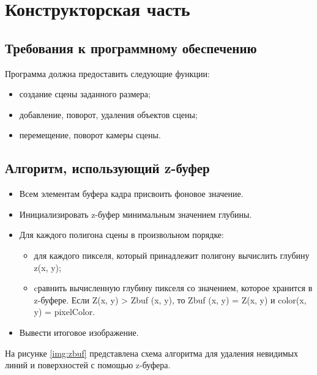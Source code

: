 \chapter{Конструкторская часть}

\section{Требования к программному обеспечению}

Программа должна предоставить следующие функции:
\begin{itemize}
    \item создание сцены заданного размера;
    \item добавление, поворот, удаления объектов сцены;
    \item перемещение, поворот камеры сцены.
\end{itemize}

\section{Алгоритм, использующий z-буфер}

\begin{itemize}[label={$\bullet$}]
    \item Всем элементам буфера кадра присвоить фоновое значение.
    \item Инициализировать z-буфер минимальным значением глубины.
    \item Для каждого полигона сцены в произвольном порядке:	
    \begin{itemize}[label={$\circ$}]
        \item для каждого пикселя, который принадлежит полигону вычислить глубину z(x, y); 
        \item cравнить вычисленную глубину пикселя со значением, которое хранится в z-буфере. 
        Если Z(x, y) > Zbuf (x, y), то Zbuf (x, y) = Z(x, y) и color(x, y) = pixelColor. 
    \end{itemize}
    \item Вывести итоговое изображение.
\end{itemize}

На рисунке \ref{img:zbuf} представлена схема алгоритма для удаления 
невидимых линий и поверхностей с помощью z-буфера. 

